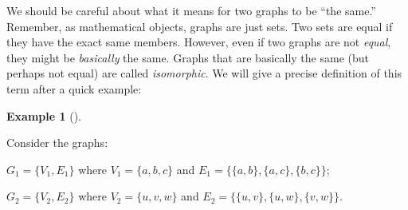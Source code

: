 \documentclass[10pt,]{book}
\theoremstyle{plain}
\theoremstyle{definition}
\newtheorem{example}[theorem]{Example}
\theoremstyle{definition}
\theoremstyle{definition}
\numberwithin{equation}{chapter}
\begin{document}
We should be careful about what it means for two graphs to be ``the same.'' Remember, as mathematical objects, graphs are just sets. Two sets are equal if they have the exact same members. However, even if two graphs are not \emph{equal}, they might be \emph{basically} the same. Graphs that are basically the same (but perhaps not equal) are called \emph{isomorphic}. We will give a precise definition of this term after a quick example:
%
\begin{example}[]\label{example-101}

Consider the graphs:
%
\par

\(G_1 = \{V_1, E_1\}\) where \(V_1 = \{a, b, c\}\) and \(E_1 = \{\{a,b\}, \{a,c\}, \{b,c\}\}\);
%
\par

\(G_2 = \{V_2, E_2\}\) where \(V_2 = \{u,v,w\}\) and \(E_2 = \{\{u,v\}, \{u,w\}, \{v,w\}\}\).
%
\par


\end{example}
\end{document}
